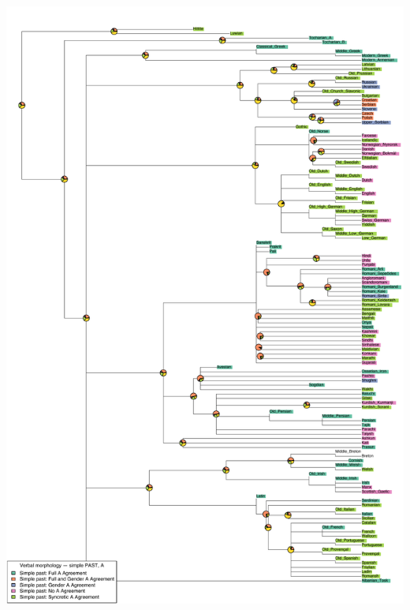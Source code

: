 \includegraphics[width=.9\linewidth]{supp-graphics/VerbalmorphologysimplePASTAPSTAAGRFULLVerbalmorphologysimplePASTAPSTAGenderAGRVerbalmorphologysimplePASTAPSTNOAAGR.pdf}

